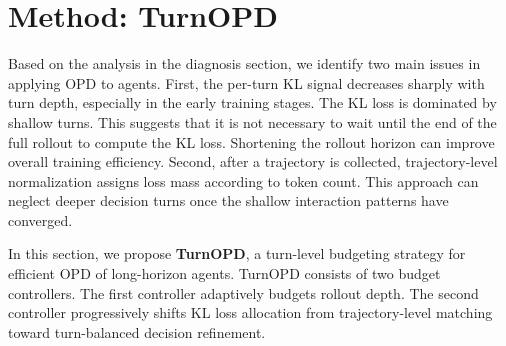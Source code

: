 \section{Method: TurnOPD}
\label{sec:method}
Based on the analysis in the diagnosis section, we identify two main issues in applying OPD to agents. First, the per-turn KL signal decreases sharply with turn depth, especially in the early training stages. The KL loss is dominated by shallow turns. This suggests that it is not necessary to wait until the end of the full rollout to compute the KL loss. Shortening the rollout horizon can improve overall training efficiency. Second, after a trajectory is collected, trajectory-level normalization assigns loss mass according to token count. This approach can neglect deeper decision turns once the shallow interaction patterns have converged. 

In this section, we propose \textbf{TurnOPD}, a turn-level budgeting strategy for efficient OPD of long-horizon agents. TurnOPD consists of two budget controllers. The first controller adaptively budgets rollout depth. The second controller progressively shifts KL loss allocation from trajectory-level matching toward turn-balanced decision refinement.




